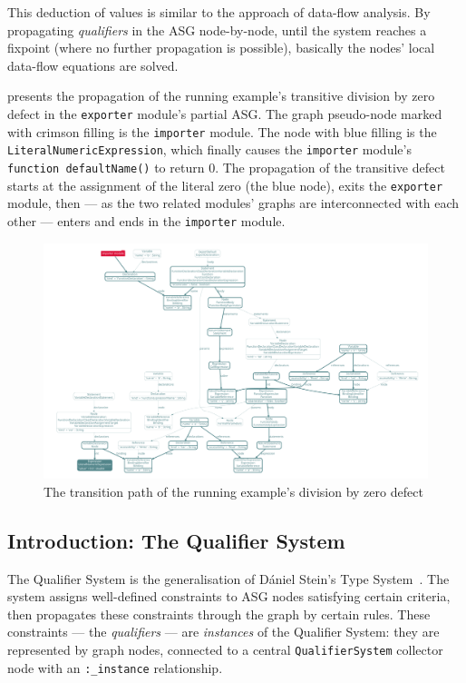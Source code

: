 This deduction of values is similar to the approach of data-flow analysis. By propagating \emph{qualifiers} in the ASG node-by-node, until the system reaches a fixpoint (where no further propagation is possible), basically the nodes' local data-flow equations are solved.

 presents the propagation of the running example's transitive division by zero defect in the \lstinline{exporter} module's partial ASG. The graph pseudo-node marked with crimson filling is the \lstinline{importer} module. The node with blue filling is the \lstinline{LiteralNumericExpression}, which finally causes the \lstinline{importer} module's \lstinline{function defaultName()} to return 0. The propagation of the transitive defect starts at the assignment of the literal zero (the blue node), exits the \lstinline{exporter} module, then — as the two related modules' graphs are interconnected with each other — enters and ends in the \lstinline{importer} module.

\begin{figure}
  \centering
	\includegraphics[width=\textwidth, trim=12mm 12mm 12mm 12mm,clip]{figures/transitive-defect-propagation.pdf}
  \caption{The transition path of the running example's division by zero defect}
  \label{fig:transitive-defect-propagation}
\end{figure}


\subsection{Introduction: The Qualifier System}

The Qualifier System is the generalisation of Dániel Stein's Type System~\cite{stein-daniel-msc}. The system assigns well-defined constraints to ASG nodes satisfying certain criteria, then propagates these constraints through the graph by certain rules. These constraints — the \emph{qualifiers} — are \emph{instances} of the Qualifier System: they are represented by graph nodes, connected to a central \lstinline{QualifierSystem} collector node with an \lstinline{:_instance} relationship.

